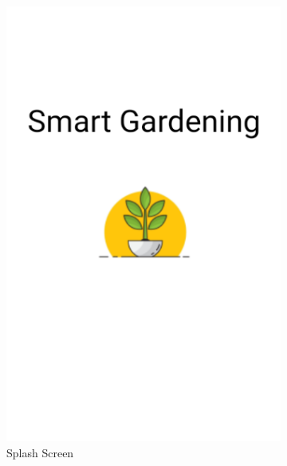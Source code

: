 \documentclass[a4paper,12pt]{report}
\begin{document}
\begin{figure}[H]

\begin{subfigure}{0.3\textwidth}
	\includegraphics[width=\textwidth]{./images/splash/splash_screen.png}
	\caption{Splash Screen}
	\label{fig:splash_screen}
\end{subfigure}
\hfill
\begin{subfigure}{0.3\textwidth}

\end{subfigure}
\end{figure}
\end{document}
